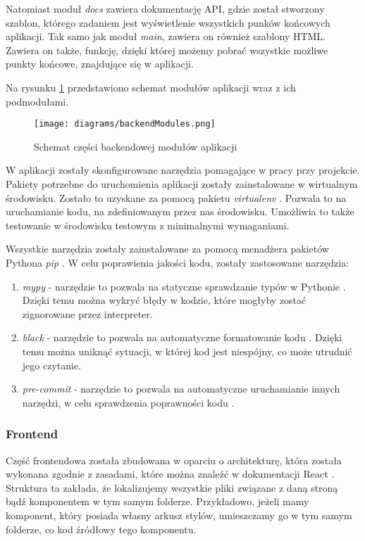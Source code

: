 Natomiast moduł \textit{docs} zawiera dokumentację API, gdzie został stworzony szablon, którego zadaniem jest wyświetlenie wszystkich punków końcowych aplikacji. Tak samo jak moduł \textit{main}, zawiera on również szablony HTML. Zawiera on także, funkcję, dzięki której możemy pobrać wszystkie możliwe punkty końcowe, znajdujące się w aplikacji.

Na rysunku \ref*{backend} przedstawiono schemat modułów aplikacji wraz z ich podmodułami.

\begin{figure}[H]
    \centering
    \texttt{[image: diagrams/backendModules.png]}
    \caption{Schemat części backendowej modułów aplikacji}
    \label{backend}
\end{figure}

W aplikacji zostały skonfigurowane narzędzia pomagające w pracy przy projekcie. Pakiety potrzebne do uruchomienia aplikacji zostały zainstalowane w wirtualnym środowisku. Zostało to uzyskane za pomocą pakietu \textit{virtualenv} \cite{virtualenv}. Pozwala to na uruchamianie kodu, na zdefiniowanym przez nas środowisku. Umożliwia to także testowanie w środowisku testowym z minimalnymi wymaganiami. 

Wszystkie narzędzia zostały zainstalowane za pomocą menadżera pakietów Pythona \textit{pip} \cite{pip}. W celu poprawienia jakości kodu, zostały zastosowane narzędzia:
\begin{enumerate}
    \item \textit{mypy} - narzędzie to pozwala na statyczne sprawdzanie typów w Pythonie \cite{mypy}. Dzięki temu można wykryć błędy w kodzie, które mogłyby zostać zignorowane przez interpreter. 
    \item \textit{black} - narzędzie to pozwala na automatyczne formatowanie kodu \cite{black}. Dzięki temu można uniknąć sytuacji, w której kod jest niespójny, co może utrudnić jego czytanie.
    \item \textit{pre-commit} - narzędzie to pozwala na automatyczne uruchamianie innych narzędzi, w celu sprawdzenia poprawności kodu \cite{pre_commit}.
\end{enumerate}

\subsubsection{Frontend}
Część frontendowa została zbudowana w oparciu o architekturę, która została wykonana zgodnie z zasadami, które można znaleźć w dokumentacji \cite{React_file_structure} React \cite{React}. Struktura ta zakłada, że lokalizujemy wszystkie pliki związane z daną stroną bądź komponentem w tym samym folderze. Przykładowo, jeżeli mamy komponent, który posiada własny arkusz stylów, umieszczamy go w tym samym folderze, co kod źródłowy tego komponentu.

